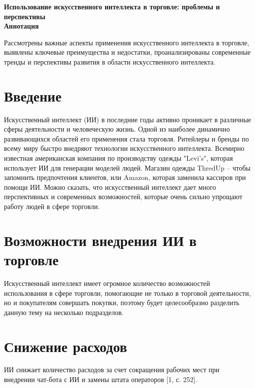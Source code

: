 \documentclass{article}
\begin{document}
\begin{center}
    \textbf{\huge {Использование искусственного интеллекта в торговле: проблемы и перспективы}}\\
    \vspace{5mm}
   \textbf{\large{Аннотация}} 
\end{center}

Рассмотрены важные аспекты применения искусственного интеллекта в торговле, выявлены ключевые преимущества и недостатки, проанализированы современные тренды и перспективы развития в области искусственного интеллекта.
\vspace{5mm}


\section*{\hspace{10mm}Введение}
\normalsize{\hspace{5mm}Искусственный интеллект (ИИ) в последние годы активно проникает в различные сферы деятельности и человеческую жизнь. Одной из наиболее динамично развивающихся областей его применения стала торговля. Ритейлеры и бренды по всему миру быстро внедряют технологии искусственного интеллекта. Всемирно известная американская компания по производству одежды "Levi's", которая использует ИИ для генерации моделей людей. Магазин одежды ThredUp – чтобы запомнить предпочтения клиентов, или Amazon, которая заменила кассиров при помощи ИИ. Можно сказать, что искусственный интеллект дает много перспективных и современных возможностей, которые очень сильно упрощают работу людей в сфере торговли.}

\section*{\hspace{10mm}Возможности внедрения ИИ в торговле}
\normalsize{\hspace{5mm}Искусственный интеллект имеет огромное количество возможностей использования в сфере торговли, помогающие не только в торговой деятельности, но и покупателям совершать покупки, поэтому будет целесообразно разделить данную тему на несколько подразделов.}

\section{Снижение расходов}
\normalsize{\hspace{5mm}ИИ снижает количество расходов за счет сокращения рабочих мест при внедрении чат-бота с ИИ и замены штата операторов [1, с. 252].}
\end{document}
